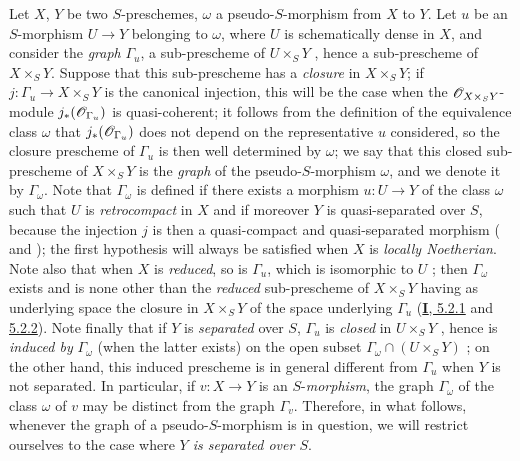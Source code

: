\begin{env}[20.4.1]\label{IV.20.4.1}
Let $X$, $Y$ be two $S$-preschemes, $\omega$ a pseudo-$S$-morphism from $X$ to $Y$.
Let $u$ be an $S$-morphism $U\to Y$ belonging to $\omega$, where $U$ is schematically dense in $X$, and consider the \emph{graph} $\Gamma_u$, a sub-prescheme of $U\times_S Y$ , hence a sub-prescheme of $X\times_S Y$.
Suppose that this sub-prescheme has a \emph{closure}  in $X\times_S Y$; if $j:\Gamma_u\to X\times_S Y$ is the canonical injection, this will be the case when the $\mathscr{O}_{X\times_S Y}$-module $j_*(\mathscr{O}_{\Gamma_u})$ is quasi-coherent; it follows from the definition of the equivalence class $\omega$  that $j_*(\mathscr{O}_{\Gamma_u})$ does not depend on the representative $u$ considered, so the closure prescheme of $\Gamma_u$ is then well determined by $\omega$; we say that this closed sub-prescheme of $X\times_S Y$ is the \emph{graph} of the pseudo-$S$-morphism $\omega$, and we denote it by $\Gamma_\omega$.
Note that $\Gamma_\omega$ is defined if there exists a morphism $u:U\to Y$ of the class $\omega$ such that $U$ is \emph{retrocompact} in $X$ and if moreover $Y$ is quasi-separated over $S$, because the injection $j$ is then a quasi-compact and quasi-separated morphism ( and ); the first hypothesis will always be satisfied when $X$ is \emph{locally Noetherian}.
Note also that when $X$ is \emph{reduced}, so is $\Gamma_u$, which is isomorphic to $U$ ; then $\Gamma_\omega$ exists and is none other than the \emph{reduced} sub-prescheme of $X\times_S Y$ having as underlying space the closure in $X\times_S Y$ of the space underlying $\Gamma_u$ (\hyperref[I.5.2.1]{\textbf{I}, 5.2.1} and \hyperref[I.5.2.2]{5.2.2}).
Note finally that if $Y$ is \emph{separated} over $S$, $\Gamma_u$ is \emph{closed} in $U\times_S Y$ , hence is \emph{induced by} $\Gamma_\omega$ (when the latter exists) on the open subset $\Gamma_\omega\cap(U\times_S Y)$ ; on the other hand, this induced prescheme is in general different from $\Gamma_u$ when $Y$ is not separated.
In particular, if $v:X\to Y$ is an $S$-\emph{morphism}, the graph $\Gamma_\omega$ of the class $\omega$ of $v$ may be distinct from the graph $\Gamma_v$.
Therefore, in what follows, whenever the graph of a pseudo-$S$-morphism is in question, we will restrict ourselves to the case where \emph{$Y$ is separated over $S$}.
\end{env}


